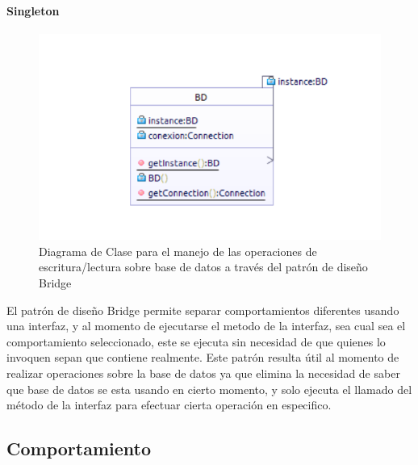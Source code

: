 \paragraph{Singleton}
\begin{figure}[H]
	\centering
	\includegraphics[width=1\linewidth]{parte2/imgs/Patrones/Singleton}
	\caption[Diagrama de clases del patrón Singleton]{Diagrama de Clase para el manejo de las operaciones de escritura/lectura sobre base de datos a través del patrón de diseño Bridge}
	\label{fig:puente}
\end{figure}

El patrón de diseño Bridge permite separar comportamientos diferentes usando una interfaz, y al momento de ejecutarse el metodo de la interfaz, sea cual sea el comportamiento seleccionado, este se ejecuta sin necesidad de que quienes lo invoquen sepan que contiene realmente. Este patrón resulta útil al momento de realizar operaciones sobre la base de datos ya que elimina la necesidad de saber que base de datos se esta usando en cierto momento, y solo ejecuta el llamado del método de la interfaz para efectuar cierta operación en especifico.

\subsection{Comportamiento}

